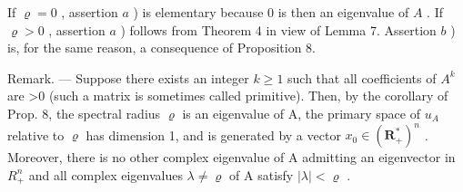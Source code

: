 If \(\varrho = 0\) , assertion \(a\) ) is elementary because 0 is then an eigenvalue of \(A\) . If \(\varrho > 0\) , assertion \(a\) ) follows from Theorem 4 in view of Lemma 7. Assertion \(b\) ) is, for the same reason, a consequence of Proposition 8.

Remark. --- Suppose there exists an integer \(k \geqslant 1\) such that all coefficients of \(A^{k}\) are \textgreater0 (such a matrix is sometimes called primitive). Then, by the corollary of Prop. 8, the spectral radius \(\varrho\) is an eigenvalue of A, the primary space of \(u_{A}\) relative to \(\varrho\) has dimension 1, and is generated by a vector \(x_{0} \in (\mathbf{R}_{+}^{*})^{n}\) . Moreover, there is no other complex eigenvalue of A admitting an eigenvector in \(R_{+}^{n}\) and all complex eigenvalues \(\lambda \neq \varrho\) of A satisfy \(|\lambda| < \varrho\) .

